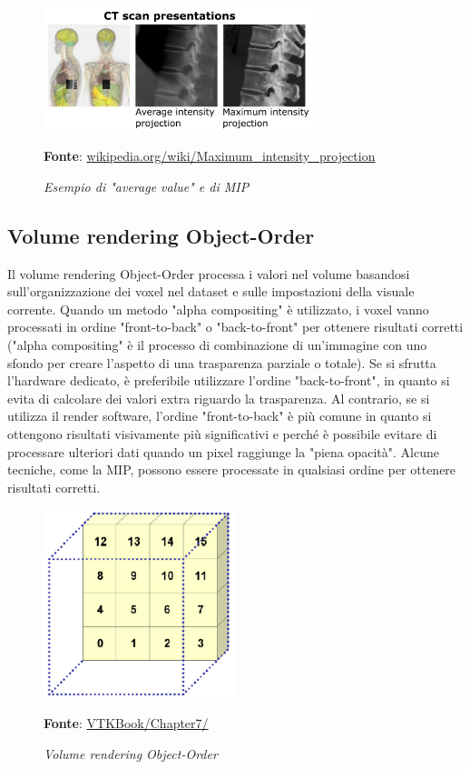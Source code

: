 \begin{figure}[h]
    \centering
    \includegraphics[width=0.7\textwidth]{immagini/volumerendering/mip.jpg}
    \caption{\textit{Esempio di "average value" e di MIP}}
    \textbf{Fonte}: \href{https://en.wikipedia.org/wiki/Maximum_intensity_projection}{wikipedia.org/wiki/Maximum\_intensity\_projection}
    \label{fig: Volume Rendering Example}
\end{figure}

\subsection{Volume rendering Object-Order}\label{sec:volume-object-order}
Il volume rendering Object-Order processa i valori nel volume basandosi sull'organizzazione dei voxel nel dataset e sulle impostazioni della visuale corrente. Quando un metodo "alpha compositing" è utilizzato, i voxel vanno processati in ordine "front-to-back" o "back-to-front" per ottenere risultati corretti ("alpha compositing" è il processo di combinazione di un'immagine con uno sfondo per creare l'aspetto di una trasparenza parziale o totale). Se si sfrutta l'hardware dedicato, è preferibile utilizzare l'ordine "back-to-front", in quanto si evita di calcolare dei valori extra riguardo la trasparenza. Al contrario, se si utilizza il render software, l'ordine "front-to-back" è più comune in quanto si ottengono risultati visivamente più significativi e perché è possibile evitare di processare ulteriori dati quando un pixel raggiunge la "piena opacità". Alcune tecniche, come la MIP, possono essere processate in qualsiasi ordine per ottenere risultati corretti.

\begin{figure}[h]
    \centering
    \includegraphics[width=0.5\textwidth]{immagini/volumerendering/objectorder.png}
    \caption{\textit{Volume rendering Object-Order}}
    \textbf{Fonte}: \href{https://lorensen.github.io/VTKExamples/site/VTKBook/07Chapter7/}{VTKBook/Chapter7/}
    \label{fig: Volume Rendering Object-Order}
\end{figure}

